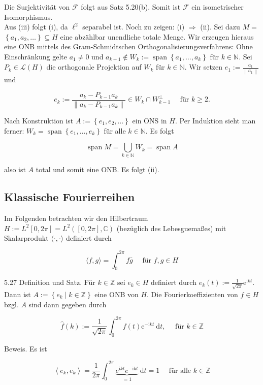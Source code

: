 \documentclass[10pt, letterpaper]{article}
\begin{document}
Die Surjektivität von $\mathcal{F}$ folgt aus Satz 5.20(b). Somit ist $\mathcal{F}$ ein isometrischer Isomorphismus.\\
Aus (iii) folgt (i), da $\ell^{2}$ separabel ist. Noch zu zeigen: (i) $\Longrightarrow$ (ii). Sei dazu $M=$ $\left\{a_{1}, a_{2}, \ldots\right\} \subseteq H$ eine abzählbar unendliche totale Menge. Wir erzeugen hieraus eine ONB mittels des Gram-Schmidtschen Orthogonalisierungsverfahrens: Ohne Einschränkung gelte $a_{1} \neq 0$ und $a_{k+1} \notin W_{k}:=\operatorname{span}\left\{a_{1}, \ldots, a_{k}\right\}$ für $k \in \mathbb{N}$. Sei $P_{k} \in \mathcal{L}(H)$ die orthogonale Projektion auf $W_{k}$ für $k \in \mathbb{N}$. Wir setzen $e_{1}:=\frac{a_{1}}{\left\|a_{1}\right\|}$ und

$$
e_{k}:=\frac{a_{k}-P_{k-1} a_{k}}{\left\|a_{k}-P_{k-1} a_{k}\right\|} \in W_{k} \cap W_{k-1}^{\perp} \quad \text { für } k \geq 2 .
$$

Nach Konstruktion ist $A:=\left\{e_{1}, e_{2}, \ldots\right\}$ ein ONS in $H$. Per Induktion sieht man ferner: $W_{k}=\operatorname{span}\left\{e_{1}, \ldots, e_{k}\right\}$ für alle $k \in \mathbb{N}$. Es folgt

$$
\operatorname{span} M=\bigcup_{k \in \mathbb{N}} W_{k}=\operatorname{span} A
$$

also ist $A$ total und somit eine ONB. Es folgt (ii).

\subsection*{Klassische Fourierreihen}
Im Folgenden betrachten wir den Hilbertraum $H:=L^{2}[0,2 \pi]=L^{2}([0,2 \pi], \mathbb{C})$ (bezüglich des Lebesguemaßes) mit Skalarprodukt $\langle\cdot, \cdot\rangle$ definiert durch

$$
\langle f, g\rangle=\int_{0}^{2 \pi} f \bar{g} \quad \text { für } f, g \in H
$$

5.27 Definition und Satz. Für $k \in \mathbb{Z}$ sei $e_{k} \in H$ definiert durch $e_{k}(t):=\frac{1}{\sqrt{2 \pi}} \mathrm{e}^{\mathrm{i} k t}$. Dann ist $A:=\left\{e_{k} \mid k \in \mathbb{Z}\right\}$ eine ONB von $H$. Die Fourierkoeffizienten von $f \in H$ bzgl. $A$ sind dann gegeben durch

$$
\hat{f}(k):=\frac{1}{\sqrt{2 \pi}} \int_{0}^{2 \pi} f(t) \mathrm{e}^{-\mathrm{i} k t} \mathrm{~d} t, \quad \text { für } k \in \mathbb{Z}
$$

Beweis. Es ist

$$
\left\langle e_{k}, e_{k}\right\rangle=\frac{1}{2 \pi} \int_{0}^{2 \pi} \underbrace{e^{\mathrm{i} k t} e^{-\mathrm{i} k t}}_{=1} \mathrm{~d} t=1 \quad \text { für alle } k \in \mathbb{Z}
$$
\end{document}
